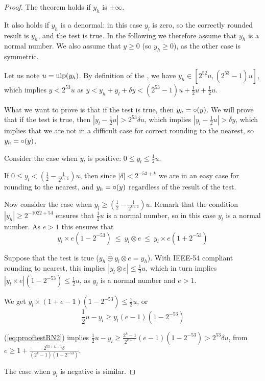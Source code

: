 \begin{proof}
  The theorem holds if $y_h$ is $\pm \infty$.
  
  It also holds if $y_h$ is a denormal: in this case $y_l$ is zero, so
  the correctly rounded result is $y_h$, and the test is true. In the
  following we therefore assume that $y_h$ is a normal number. We also
  assume that $y\ge0$ (so $y_h\ge0$), as the other case is symmetric.
  
  Let us note $u=\mbox{ulp}(y_h)$. By definition of the \ulp, we have $y_h
  \in [2^{52}u, (2^{53}-1)u]$, which implies $y<2^{53}u$ as $y < y_h + y_l + \delta y
  < (2^{53}-1)u +\frac{1}{2}u +\frac{1}{2}u$.

  What we want to prove is that if the test is true, then $y_h =
  \circ(y)$. We will prove that  if the test is true, then $|y_l-\frac{1}{2}u| > 2^{53}\delta
  u$, which implies $|y_l-\frac{1}{2}u| > \delta y$, which implies
  that we are not in a difficult case for correct rounding to the
  nearest, so $y_h = \circ(y)$.

  Consider the case when $y_l$ is positive:  $0\le y_l \le \frac{1}{2}u$.

  If $0 \le y_l < (\frac{1}{2} - \frac{1}{2^{k+1}})u$, then since
    $|\delta|<2^{-53+k}$ we are in an easy case for rounding to the
    nearest, and $y_h = \circ(y)$ regardless of the result of the test.

    Now consider the case when $y_l \ge (\frac{1}{2} - \frac{1}{2^{k+1}})u$.
    Remark that the condition $|y_h|\ge 2^{-1022+54}$ ensures that
    $\frac{1}{2}u$ is a normal number, so in this case
    $y_l$ is a normal number. As $e>1$ this ensures that
    $$y_l\times e(1-2^{-53})\ \le\ y_l \otimes e\ \le\ y_l\times e(1+2^{-53})$$


  Suppose that the test is true ($y_h \oplus y_l \otimes e = y_h$). 
  With IEEE-54 compliant rounding to
  nearest, this implies $|y_l \otimes e|
  \le \frac{1}{2}u$, which in turn implies $|y_l \times e|
  (1-2^{-53}) \le \frac{1}{2}u$, as $y_l$ is a normal number and $e>1$. 
  
  We get $y_l \times (1+e-1)(1-2^{-53}) \le \frac{1}{2}u$, or
  \begin{equation}
  \frac{1}{2}u - y_l \ge y_l (e-1)(1-2^{-53})\label{eq:prooftestRN2}
  \end{equation}  

(\ref{eq:prooftestRN2}) implies
    $\frac{1}{2}u - y_l \ge \frac{2^{k}-1}{2^{k+1}} (e-1)(1-2^{-53}) >
    2^{53}\delta u$, from $e\ge 1+
    \frac{2^{53+k+1}\delta}{(2^{k}-1)(1-2^{-53})}$.

  The case when $y_l$ is negative is similar.
\end{proof}



